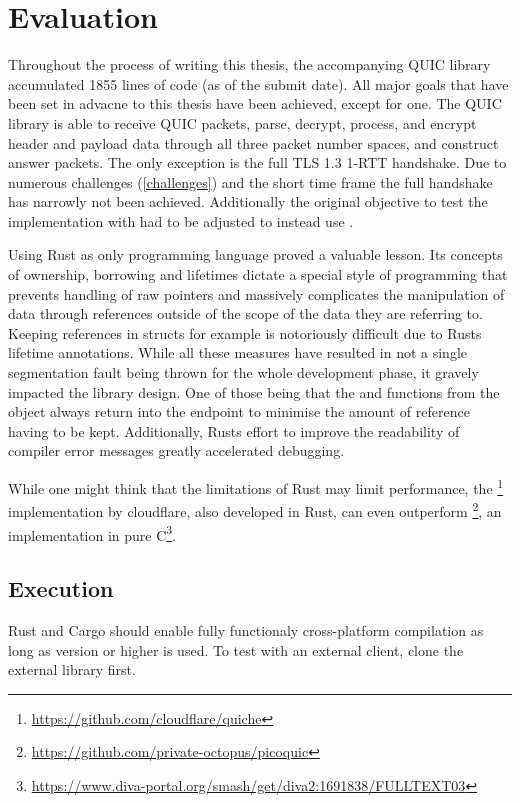 \chapter{Evaluation}

Throughout the process of writing this thesis, the accompanying QUIC library accumulated 1855 lines of code (as of the submit date).
All major goals that have been set in advacne to this thesis have been achieved, except for one. The QUIC library is able to receive
QUIC packets, parse, decrypt, process, and encrypt header and payload data through all three packet number spaces, and construct
answer packets. The only exception is the full TLS 1.3 1-RTT handshake. Due to numerous challenges (\ref{challenges}) and the short
time frame the full handshake has narrowly not been achieved. Additionally the original objective to test the implementation with
 had to be adjusted to instead use . 

Using Rust as only programming language proved a valuable lesson. Its concepts of ownership, borrowing and lifetimes dictate a
special style of programming that prevents handling of raw pointers and massively complicates the manipulation of data through
references outside of the scope of the data they are referring to. Keeping references in structs for example is notoriously
difficult due to Rusts lifetime annotations. While all these measures have resulted in not a single segmentation fault being
thrown for the whole development phase, it gravely impacted the library design. One of those being that the 
and  functions from the  object always return into the endpoint to minimise the
amount of reference having to be kept. Additionally, Rusts effort to improve the readability of compiler error messages
greatly accelerated debugging.

While one might think that the limitations of Rust may limit performance, the
\footnote{\url{https://github.com/cloudflare/quiche}} implementation by cloudflare, also developed in Rust,
can even outperform \footnote{\url{https://github.com/private-octopus/picoquic}}, an implementation in
pure C\footnote{\url{https://www.diva-portal.org/smash/get/diva2:1691838/FULLTEXT03}}.

\section{Execution}
Rust and Cargo should enable fully functionaly cross-platform compilation as long as  version 
or higher is used. To test with an external client, clone the external library  first.

